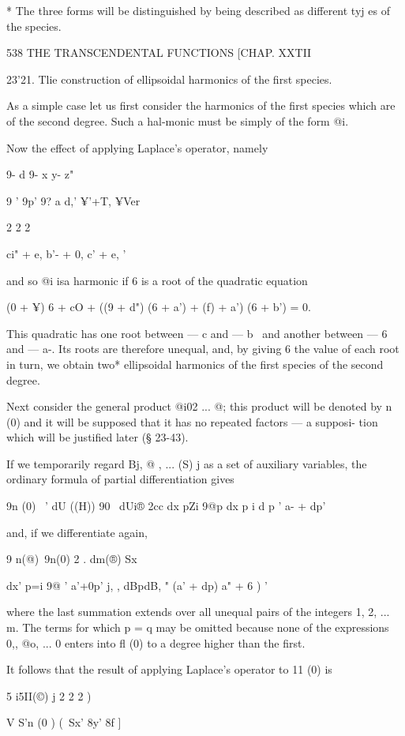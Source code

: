 * The three forms will be distinguished by being described as
different tyj es of the species.

538 THE TRANSCENDENTAL FUNCTIONS [CHAP. XXTII

23'21. Tlie construction of ellipsoidal harmonics of the first
species.

As a simple case let us first consider the harmonics of the first
species which are of the second degree. Such a hal-monic must be
simply of the form @i.

Now the effect of applying Laplace's operator, namely

9- d 9- x y- z"

9 ' 9p' 9? a d,' ¥'+T, ¥Ver

2 2 2

ci" + e, b'- + 0, c' + e, '

and so @i isa harmonic if 6 is a root of the quadratic equation

(0 + ¥) 6 + cO + ((9 + d") (6 + a') + (f) + a') (6 + b') = 0.

This quadratic has one root between — c and — b~ and another between —
6 and — a-. Its roots are therefore unequal, and, by giving 6 the
value of each root in turn, we obtain two* ellipsoidal harmonics of
the first species of the second degree.

Next consider the general product @i02 ... @; this product will be
denoted by n (0) and it will be supposed that it has no repeated
factors — a supposi- tion which will be justified later (§ 23-43).

If we temporarily regard Bj, @ , ... (S) j as a set of auxiliary
variables, the ordinary formula of partial differentiation gives

9n (0) \ ' dU ((H)) 90 \ dUi® 2cc dx pZi 9@p dx p i d p ' a- + dp'

and, if we differentiate again,

9 n(@)\ 9n(0) 2 . dm(®) Sx

dx' p=i 9@ ' a'+0p' j, , dBpdB, " (a' + dp) a" + 6 ) '

where the last summation extends over all unequal pairs of the
integers 1, 2, ... m. The terms for which p = q may be omitted because
none of the expressions 0,, @o, ... 0 enters into fl (0) to a degree
higher than the first.

It follows that the result of applying Laplace's operator to 11 (0) is

5 i5II(©) j 2 2 2 )

V S'n (0 ) (\ Sx' 8y' 8f ]

